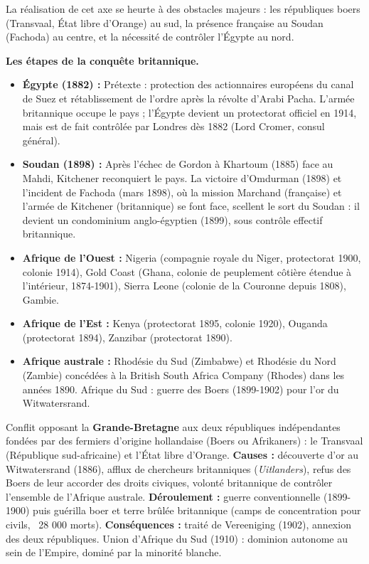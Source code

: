 \documentclass[11pt]{article}
\newcommand{\cle}[1]{{\popxbold\color{popdark}#1}}
\begin{document}
La réalisation de cet axe se heurte à des obstacles majeurs : les républiques boers (Transvaal, État libre d'Orange) au sud, la présence française au Soudan (Fachoda) au centre, et la nécessité de contrôler l'Égypte au nord.

\textbf{Les étapes de la conquête britannique.}\par
\begin{itemize}
    \item \textbf{Égypte (1882) :} Prétexte : protection des actionnaires européens du canal de Suez et rétablissement de l'ordre après la révolte d'Arabi Pacha. L'armée britannique occupe le pays ; l'Égypte devient un \cle{protectorat} officiel en 1914, mais est de fait contrôlée par Londres dès 1882 (Lord Cromer, consul général).
    \item \textbf{Soudan (1898) :} Après l'échec de Gordon à Khartoum (1885) face au Mahdi, Kitchener reconquiert le pays. La victoire d'\cle{Omdurman} (1898) et l'incident de \cle{Fachoda} (mars 1898), où la mission Marchand (française) et l'armée de Kitchener (britannique) se font face, scellent le sort du Soudan : il devient un condominium anglo-égyptien (1899), sous contrôle effectif britannique.
    \item \textbf{Afrique de l'Ouest :} \cle{Nigeria} (compagnie royale du Niger, protectorat 1900, colonie 1914), \cle{Gold Coast} (Ghana, colonie de peuplement côtière étendue à l'intérieur, 1874-1901), \cle{Sierra Leone} (colonie de la Couronne depuis 1808), \cle{Gambie}.
    \item \textbf{Afrique de l'Est :} \cle{Kenya} (protectorat 1895, colonie 1920), \cle{Ouganda} (protectorat 1894), \cle{Zanzibar} (protectorat 1890).
    \item \textbf{Afrique australe :} \cle{Rhodésie du Sud} (Zimbabwe) et \cle{Rhodésie du Nord} (Zambie) concédées à la British South Africa Company (Rhodes) dans les années 1890. \cle{Afrique du Sud} : guerre des Boers (1899-1902) pour l'or du Witwatersrand.
\end{itemize}

\begin{definition}
Conflit opposant la \textbf{Grande-Bretagne} aux deux républiques indépendantes fondées par des fermiers d'origine hollandaise (\cle{Boers} ou Afrikaners) : le \cle{Transvaal} (République sud-africaine) et l'\cle{État libre d'Orange}. 
\textbf{Causes :} découverte d'or au Witwatersrand (1886), afflux de chercheurs britanniques (\emph{Uitlanders}), refus des Boers de leur accorder des droits civiques, volonté britannique de contrôler l'ensemble de l'Afrique australe.
\textbf{Déroulement :} guerre conventionnelle (1899-1900) puis guérilla boer et terre brûlée britannique (camps de concentration pour civils, ~28 000 morts). 
\textbf{Conséquences :} traité de Vereeniging (1902), annexion des deux républiques. Union d'Afrique du Sud (1910) : dominion autonome au sein de l'Empire, dominé par la minorité blanche.
\end{definition}
\end{document}

